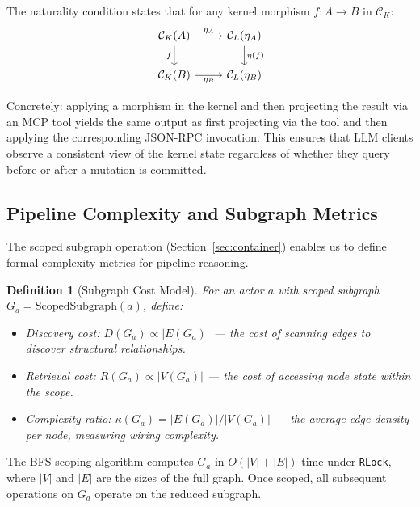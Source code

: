 \documentclass[submission,copyright,creativecommons]{eptcs}
\newtheorem{definition}{Definition}
\begin{document}
The naturality condition states that for any kernel morphism $f\colon A \to B$
in $\mathcal{C}_K$:
\begin{equation}
\label{eq:naturality-mcp}
\begin{tikzcd}
\mathcal{C}_K(A) \arrow[r, "\eta_A"] \arrow[d, "f"'] & \mathcal{C}_L(\eta_A) \arrow[d, "\eta(f)"] \\
\mathcal{C}_K(B) \arrow[r, "\eta_B"'] & \mathcal{C}_L(\eta_B)
\end{tikzcd}
\end{equation}

Concretely: applying a morphism in the kernel and then projecting the result
via an MCP tool yields the same output as first projecting via the tool and
then applying the corresponding JSON-RPC invocation. This ensures that LLM
clients observe a consistent view of the kernel state regardless of whether
they query before or after a mutation is committed.

\subsection{Pipeline Complexity and Subgraph Metrics}
\label{subsec:pipeline-complexity}

The scoped subgraph operation (Section~\ref{sec:container}) enables us to
define formal complexity metrics for pipeline reasoning.

\begin{definition}[Subgraph Cost Model]
For an actor $a$ with scoped subgraph $G_a = \mathrm{ScopedSubgraph}(a)$,
define:
\begin{itemize}
  \item \emph{Discovery cost}: $D(G_a) \propto |E(G_a)|$ --- the cost of
        scanning edges to discover structural relationships.
  \item \emph{Retrieval cost}: $R(G_a) \propto |V(G_a)|$ --- the cost of
        accessing node state within the scope.
  \item \emph{Complexity ratio}: $\kappa(G_a) = |E(G_a)| / |V(G_a)|$ ---
        the average edge density per node, measuring wiring complexity.
\end{itemize}
\end{definition}

The BFS scoping algorithm computes $G_a$ in $O(|V| + |E|)$ time under
\texttt{RLock}, where $|V|$ and $|E|$ are the sizes of the full graph. Once
scoped, all subsequent operations on $G_a$ operate on the reduced subgraph.
\end{document}

